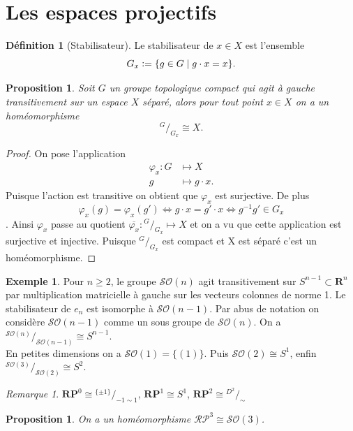 \documentclass[12pt]{book}
\newcommand{\defeq}{\vcentcolon=}
\newtheorem{prop}[lemma]{Proposition}
\theoremstyle{definition}
\newtheorem{definition}[lemma]{Définition}
\newtheorem{example}[lemma]{Exemple}
\theoremstyle{remark}
\newtheorem*{remark}{Remarque}
\newcommand*\quot[2]{{^{\textstyle #1}\big/_{\textstyle #2}}}
\begin{document}
	\section{Les espaces projectifs}

	\begin{definition}[Stabilisateur]
		Le stabilisateur de $x\in X$ est l'ensemble \[
			G_x \defeq \{g\in G \;|\; g\cdot x = x\} 
		.\] 	
	\end{definition}
	\begin{prop}
		Soit $G$ un groupe topologique compact qui agit à gauche transitivement sur un espace $X$ séparé, alors pour tout point $x\in X$ on a un homéomorphisme  \[
			\quot{G}{G_x} \cong X
		.\] 
	\end{prop}
	\begin{proof}
		On pose l'application 
		\begin{align*}
			\varphi_x : G&\longmapsto X \\
			g &\longmapsto g\cdot x
		.\end{align*}
		Puisque l'action est transitive on obtient que $\varphi_x$ est surjective. De plus $$\varphi_x(g) = \varphi_x(g') \iff g\cdot x = g'\cdot x \iff g^{-1}g' \in G_x$$. Ainsi $\varphi_x$ passe au quotient  $\overline{\varphi_x} : \quot{G}{G_x} \longmapsto X$ et on a vu que cette application est surjective et injective. Puisque $\quot{G}{G_x}$ est compact et X est séparé c'est un homéomorphisme.
	\end{proof}

	\begin{example}
		Pour $ n\ge 2$, le groupe $\mathcal{SO}(n)$ agit transitivement sur $S^{n-1} \subset \mathbf{R}^{n}$ par multiplication matricielle à gauche sur les vecteurs colonnes de norme 1.
		Le stabilisateur de $e_n$ est isomorphe à $\mathcal{SO}(n-1)$. Par abus de notation on considère $\mathcal{SO}(n-1)$ comme un sous groupe de $\mathcal{SO}(n)$. On a $\quot{\mathcal{SO}(n)}{\mathcal{SO}(n-1)} \cong S^{n-1}$.\\
		En petites dimensions on a $\mathcal{SO}(1) = \{(1)\}$. Puis $\mathcal{SO}(2) \cong S^1$, enfin $\quot{\mathcal{SO}(3)}{\mathcal{SO}(2)} \cong S^2$.
	\end{example}
	\begin{remark}
$\mathbf{RP}^0 \cong \quot{\{\pm 1\}}{-1 \sim 1}$, $\mathbf{RP}^1 \cong S^1$, $\mathbf{RP}^2 \cong \quot{D^2}{\sim}$
	\end{remark}
	\begin{prop}
		On a un homéomorphisme $\mathcal{RP}^3 \cong \mathcal{SO}(3)$.
	\end{prop}
\end{document}
